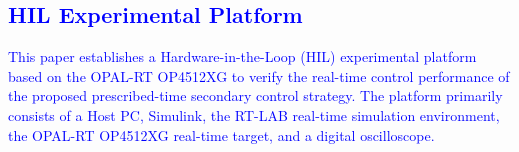 \documentclass[]{interact}
\theoremstyle{plain}%
\theoremstyle{definition}
\theoremstyle{remark}
\begin{document}



\textcolor{blue}{\subsection{HIL Experimental Platform}}


\textcolor{blue}{This paper establishes a Hardware-in-the-Loop (HIL) experimental platform based on the OPAL-RT OP4512XG to verify the real-time control performance of the proposed prescribed-time secondary control strategy. The platform primarily consists of a Host PC, Simulink, the RT-LAB real-time simulation environment, the OPAL-RT OP4512XG real-time target, and a digital oscilloscope.}
\end{document}

